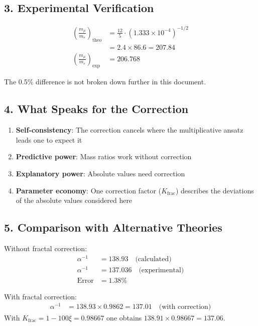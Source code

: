 	\subsection*{3. Experimental Verification}
	
	\begin{align*}
		\left(\frac{m_\mu}{m_e}\right)_{\text{theo}} &= \frac{12}{5} \cdot (1.333 \times 10^{-4})^{-1/2} \\
		&= 2.4 \times 86.6 = 207.84 \\
		\left(\frac{m_\mu}{m_e}\right)_{\text{exp}} &= 206.768
	\end{align*}
	
	The 0.5\% difference is not broken down further in this document.
	
	\subsection*{4. What Speaks for the Correction}
	
	\begin{enumerate}
		\item \textbf{Self-consistency}: The correction cancels where the multiplicative ansatz leads one to expect it
		\item \textbf{Predictive power}: Mass ratios work without correction
		\item \textbf{Explanatory power}: Absolute values need correction
		\item \textbf{Parameter economy}: One correction factor ($K_{\text{frac}}$) describes the deviations of the absolute values considered here
	\end{enumerate}
	
	\subsection*{5. Comparison with Alternative Theories}
	
	Without fractal correction:
	\begin{align*}
		\alpha^{-1} &= 138.93 \quad \text{(calculated)} \\
		\alpha^{-1} &= 137.036 \quad \text{(experimental)} \\
		\text{Error} &= 1.38\%
	\end{align*}
	
	With fractal correction:
	\begin{align*}
		\alpha^{-1} &= 138.93 \times 0.9862 = 137.01 \quad \text{(with correction)}
	\end{align*}
	With $K_{\text{frac}} = 1-100\xi = 0.98667$ one obtains $138.91\times0.98667 = 137.06$.

